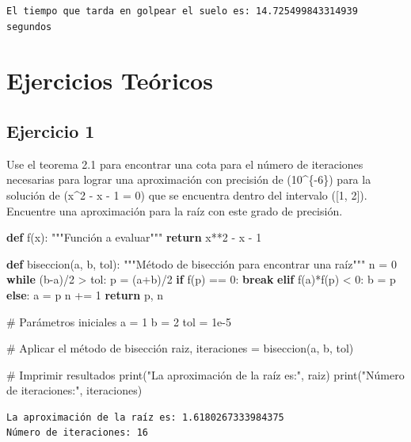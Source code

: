 \documentclass[
  letterpaper,
  DIV=11,
  numbers=noendperiod]{scrartcl}
\newenvironment{Shaded}{\begin{snugshade}}{\end{snugshade}}
\newcommand{\BuiltInTok}[1]{\textcolor[rgb]{0.00,0.23,0.31}{#1}}
\newcommand{\CommentTok}[1]{\textcolor[rgb]{0.37,0.37,0.37}{#1}}
\newcommand{\ControlFlowTok}[1]{\textcolor[rgb]{0.00,0.23,0.31}{\textbf{#1}}}
\newcommand{\DecValTok}[1]{\textcolor[rgb]{0.68,0.00,0.00}{#1}}
\newcommand{\FloatTok}[1]{\textcolor[rgb]{0.68,0.00,0.00}{#1}}
\newcommand{\KeywordTok}[1]{\textcolor[rgb]{0.00,0.23,0.31}{\textbf{#1}}}
\newcommand{\NormalTok}[1]{\textcolor[rgb]{0.00,0.23,0.31}{#1}}
\newcommand{\OperatorTok}[1]{\textcolor[rgb]{0.37,0.37,0.37}{#1}}
\newcommand{\StringTok}[1]{\textcolor[rgb]{0.13,0.47,0.30}{#1}}
\begin{document}
\begin{verbatim}
El tiempo que tarda en golpear el suelo es: 14.725499843314939 segundos
\end{verbatim}

\section{Ejercicios Teóricos}\label{ejercicios-teuxf3ricos}

\subsection{Ejercicio 1}\label{ejercicio-1-2}

Use el teorema 2.1 para encontrar una cota para el número de iteraciones
necesarias para lograr una aproximación con precisión de (10\^{}\{-6\})
para la solución de (x\^{}2 - x - 1 = 0) que se encuentra dentro del
intervalo ({[}1, 2{]}). Encuentre una aproximación para la raíz con este
grado de precisión.

\begin{Shaded}
\begin{Highlighting}[]
\KeywordTok{def}\NormalTok{ f(x):}
  \CommentTok{"""Función a evaluar"""}
  \ControlFlowTok{return}\NormalTok{ x}\OperatorTok{**}\DecValTok{2} \OperatorTok{{-}}\NormalTok{ x }\OperatorTok{{-}} \DecValTok{1}

\KeywordTok{def}\NormalTok{ biseccion(a, b, tol):}
  \CommentTok{"""Método de bisección para encontrar una raíz"""}
\NormalTok{  n }\OperatorTok{=} \DecValTok{0}
  \ControlFlowTok{while}\NormalTok{ (b}\OperatorTok{{-}}\NormalTok{a)}\OperatorTok{/}\DecValTok{2} \OperatorTok{\textgreater{}}\NormalTok{ tol:}
\NormalTok{    p }\OperatorTok{=}\NormalTok{ (a}\OperatorTok{+}\NormalTok{b)}\OperatorTok{/}\DecValTok{2}
    \ControlFlowTok{if}\NormalTok{ f(p) }\OperatorTok{==} \DecValTok{0}\NormalTok{:}
      \ControlFlowTok{break}
    \ControlFlowTok{elif}\NormalTok{ f(a)}\OperatorTok{*}\NormalTok{f(p) }\OperatorTok{\textless{}} \DecValTok{0}\NormalTok{:}
\NormalTok{      b }\OperatorTok{=}\NormalTok{ p}
    \ControlFlowTok{else}\NormalTok{:}
\NormalTok{      a }\OperatorTok{=}\NormalTok{ p}
\NormalTok{    n }\OperatorTok{+=} \DecValTok{1}
  \ControlFlowTok{return}\NormalTok{ p, n}

\CommentTok{\# Parámetros iniciales}
\NormalTok{a }\OperatorTok{=} \DecValTok{1}
\NormalTok{b }\OperatorTok{=} \DecValTok{2}
\NormalTok{tol }\OperatorTok{=} \FloatTok{1e{-}5}

\CommentTok{\# Aplicar el método de bisección}
\NormalTok{raiz, iteraciones }\OperatorTok{=}\NormalTok{ biseccion(a, b, tol)}

\CommentTok{\# Imprimir resultados}
\BuiltInTok{print}\NormalTok{(}\StringTok{"La aproximación de la raíz es:"}\NormalTok{, raiz)}
\BuiltInTok{print}\NormalTok{(}\StringTok{"Número de iteraciones:"}\NormalTok{, iteraciones)}
\end{Highlighting}
\end{Shaded}

\begin{verbatim}
La aproximación de la raíz es: 1.6180267333984375
Número de iteraciones: 16
\end{verbatim}
\end{document}
